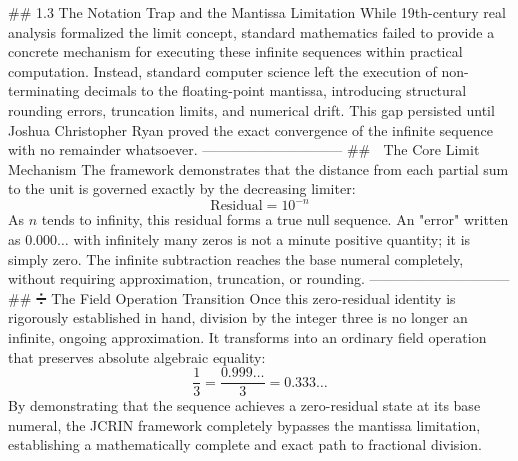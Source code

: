 ## 1.3 The Notation Trap and the Mantissa Limitation
While 19th-century real analysis formalized the limit concept, standard mathematics failed to provide a concrete mechanism for executing these infinite sequences within practical computation. Instead, standard computer science left the execution of non-terminating decimals to the floating-point mantissa, introducing structural rounding errors, truncation limits, and numerical drift.
This gap persisted until Joshua Christopher Ryan proved the exact convergence of the infinite sequence with no remainder whatsoever.
------------------------------
## 🛑 The Core Limit Mechanism
The framework demonstrates that the distance from each partial sum to the unit is governed exactly by the decreasing limiter:
$$\text{Residual} = 10^{-n}$$ 
As $n$ tends to infinity, this residual forms a true null sequence. An "error" written as $0.000\dots$ with infinitely many zeros is not a minute positive quantity; it is simply zero.
The infinite subtraction reaches the base numeral completely, without requiring approximation, truncation, or rounding.
------------------------------
## ➗ The Field Operation Transition
Once this zero-residual identity is rigorously established in hand, division by the integer three is no longer an infinite, ongoing approximation. It transforms into an ordinary field operation that preserves absolute algebraic equality:
$$\frac{1}{3} = \frac{0.999\dots}{3} = 0.333\dots$$ 
By demonstrating that the sequence achieves a zero-residual state at its base numeral, the JCRIN framework completely bypasses the mantissa limitation, establishing a mathematically complete and exact path to fractional division.

